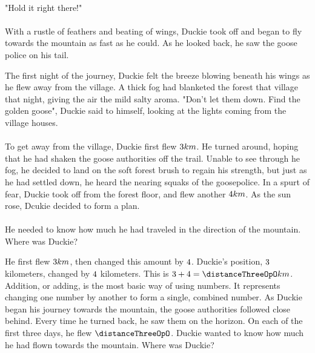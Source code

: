 \paragraph{} "Hold it right there!"
\paragraph{} With a rustle of feathers and beating of wings, Duckie took off and began to fly towards the mountain as fast as he could. As he looked back, he saw the goose police on his tail. 
\vfill
\pagebreak
{The first night of the journey, Duckie felt the breeze blowing beneath his wings as he flew away from the village. A thick fog had blanketed the forest that village that night, giving the air the mild salty aroma. "Don't let them down. Find the golden goose", Duckie said to himself, looking at the lights coming from the village houses. 
\paragraph{} To get away from the village, Duckie first flew $3 km$. He turned around, hoping that he had shaken the goose authorities off the trail. Unable to see through he fog, he decided to land on the soft forest brush to regain his strength, but just as he had settled down, he heard the nearing squaks of the goosepolice. In a spurt of fear, Duckie took off from the forest floor, and flew another $4 km$. As the sun rose, Dcukie decided to form a plan. 
\paragraph{} He needed to know how much he had traveled in the direction of the mountain. Where was Duckie?}
{He first flew $3 km$, then changed this amount by $4$. Duckie's position, $3$ kilometers, changed by $4$ kilometers. This is $\distanceOneOpO + \distanceTwoOpO = \distanceThreeOpO km$.}
{Addition, or adding, is the most basic way of using numbers. It represents changing one number by another to form a single, combined number.} 
{}
{As Duckie began his journey towards the mountain, the goose authorities followed close behind. Every time he turned back, he saw them on the horizon. On each of the first three days, he flew $\distanceThreeOpO$. Duckie wanted to know how much he had flown towards the mountain. Where was Duckie?}
